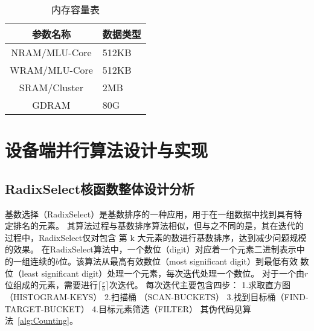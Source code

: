 \begin{table}
    \centering
    \caption{内存容量表}
    \label{tab:duiqi}
    \begin{tabular}{cl} %
      \toprule
      参数名称   & 数据类型        \\
      \midrule
      NRAM/MLU-Core & 512KB     \\
      WRAM/MLU-Core   & 512KB   \\
      SRAM/Cluster& 2MB         \\
      GDRAM       &  80G \\
      \bottomrule
    \end{tabular}
\end{table}
   



\section{设备端并行算法设计与实现}

\subsection{RadixSelect核函数整体设计分析}
基数选择（RadixSelect）是基数排序的一种应用，用于在一组数据中找到具有特定排名的元素。
其算法过程与基数排序算法相似，但与之不同的是，其在迭代的过程中，RadixSelect仅对包含
第 k 大元素的数进行基数排序，达到减少问题规模的效果。
在RadixSelect算法中，一个数位（digit）对应着一个元素二进制表示中
的一组连续的\(b\)位。该算法从最高有效数位（most significant digit）到最低有效
数位（least significant digit）处理一个元素，每次迭代处理一个数位。
对于一个由\(r\)位组成的元素，需要进行\(\lceil\frac{r}{b}\rceil\)次迭代。
每次迭代主要包含四步：
1.求取直方图（HISTOGRAM-KEYS） 
2.扫描桶 （SCAN-BUCKETS） 
3.找到目标桶（FIND-TARGET-BUCKET） 
4.目标元素筛选（FILTER）
其伪代码见算法~\ref{alg:Counting}。

